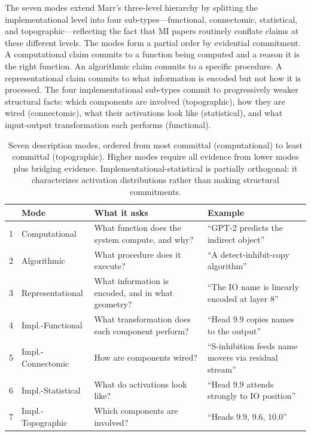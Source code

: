 \documentclass[10pt]{article}
\begin{document}
The seven modes extend Marr's three-level hierarchy \citep{marr1982vision} by splitting the implementational level into four sub-types---functional, connectomic, statistical, and topographic---reflecting the fact that MI papers routinely conflate claims at these different levels. The modes form a partial order by evidential commitment. A computational claim commits to a function being computed and a reason it is the right function. An algorithmic claim commits to a specific procedure. A representational claim commits to what information is encoded but not how it is processed. The four implementational sub-types commit to progressively weaker structural facts: which components are involved (topographic), how they are wired (connectomic), what their activations look like (statistical), and what input-output transformation each performs (functional).

\begin{table}[H]
\centering
\small
\caption{Seven description modes, ordered from most committal (computational) to least committal (topographic). Higher modes require all evidence from lower modes plus bridging evidence. Implementational-statistical is partially orthogonal: it characterizes activation distributions rather than making structural commitments.}
\label{tab:modes}
\renewcommand{\arraystretch}{1.2}
\begin{tabular}{@{}rl>{\raggedright\arraybackslash}p{4.8cm}>{\raggedright\arraybackslash}p{5.2cm}@{}}
\toprule
& \textbf{Mode} & \textbf{What it asks} & \textbf{Example} \\
\midrule
1 & Computational & What function does the system compute, and why? & ``GPT-2 predicts the indirect object'' \\
\midrule
2 & Algorithmic & What procedure does it execute? & ``A detect-inhibit-copy algorithm'' \\
\midrule
3 & Representational & What information is encoded, and in what geometry? & ``The IO name is linearly encoded at layer 8'' \\
\midrule
4 & Impl.-Functional & What transformation does each component perform? & ``Head 9.9 copies names to the output'' \\
\midrule
5 & Impl.-Connectomic & How are components wired? & ``S-inhibition feeds name movers via residual stream'' \\
\midrule
6 & Impl.-Statistical & What do activations look like? & ``Head 9.9 attends strongly to IO position'' \\
\midrule
7 & Impl.-Topographic & Which components are involved? & ``Heads 9.9, 9.6, 10.0'' \\
\bottomrule
\end{tabular}
\end{table}
\end{document}
